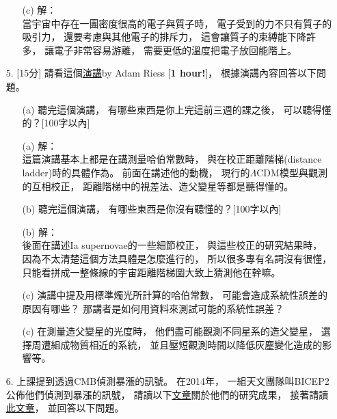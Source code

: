 \documentclass{article}
\theoremstyle{definition}
\begin{document}
\begin{enumerate}
\begin{enumerate}
			\item[(c)] 解：\\
				當宇宙中存在一團密度很高的電子與質子時，
				電子受到的力不只有質子的吸引力，
				還要考慮與其他電子的排斥力，
				這會讓質子的束縛能下降許多，
				讓電子非常容易游離，
				需要更低的溫度把電子放回能階上。

		\end{enumerate}

	\item[5.] [15分] 請看這個\href{https://www.youtube.com/watch?v=JmDszPExepc&ab_channel=issiber}{演講}by Adam Riess [\textbf{1 hour!}]，
		根據演講內容回答以下問題。

		\begin{enumerate}
			\item[(a)] 聽完這個演講，
				有哪些東西是你上完這前三週的課之後，
				可以聽得懂的？[100字以內]

			\item[(a)] 解：\\
				這篇演講基本上都是在講測量哈伯常數時，
				與在校正距離階梯(distance ladder)時的具體作為。
				前面在講述他的動機，
				現行的$\Lambda$CDM模型與觀測的互相校正，
				距離階梯中的視差法、造父變星等都是聽得懂的。

			\item[(b)] 聽完這個演講，
				有哪些東西是你沒有聽懂的？[100字以內]

			\item[(b)] 解：\\
				後面在講述Ia supernovae的一些細節校正，
				與這些校正的研究結果時，
				因為不太清楚這個方法具體是怎麼進行的，
				所以很多專有名詞沒有很懂，
				只能看拼成一整條線的宇宙距離階梯圖大致上猜測他在幹嘛。

			\item[(c)] 演講中提及用標準燭光所計算的哈伯常數，
				可能會造成系統性誤差的原因有哪些？
				那講者是如何用資料來測試可能的系統性誤差？

			\item[(c)] 在測量造父變星的光度時，
				他們盡可能觀測不同星系的造父變星，
				選擇周遭組成物質相近的系統，
				並且壓短觀測時間以降低灰塵變化造成的影響等。

		\end{enumerate}

	\item[6.] 上課提到透過CMB偵測暴漲的訊號。
		在2014年，
		一組天文團隊叫BICEP2公佈他們偵測到暴漲的訊號，
		請讀以下\href{https://physicsworld.com/a/bicep2-finds-first-direct-evidence-of-cosmic-inflation/#:~:text=The\%20first\%20evidence\%20for\%20the,telescope\%20at\%20the\%20South\%20Pole.}{文章}關於他們的研究成果，
		接著請讀\href{https://phys.org/news/2015-02-cosmic-inflation-bicep2-results.html}{此文章}，
		並回答以下問題。
		\begin{enumerate}
			

\end{enumerate}
\end{enumerate}
\end{document}
